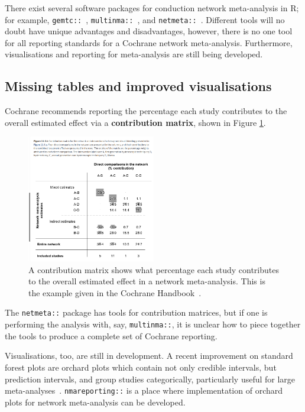\documentclass[12pt]{article}\usepackage[]{graphicx}\usepackage[]{color}
\newcommand{\package}[1]{\texttt{{#1::}}}
\begin{document}
There exist several software packages for conduction network meta-analysis in R; for example, \package{gemtc}~\cite{valkenhoef_gemtc_2020}, \package{multinma}~\cite{phillippo_multinma_2020}, and \package{netmeta}~\cite{rucker_netmeta_2021}. Different tools will no doubt have unique advantages and disadvantages, however, there is no one tool for all reporting standards for a Cochrane network meta-analysis. Furthermore, visualisations and reporting for meta-analysis are still being developed.

\subsection{Missing tables and improved visualisations}


Cochrane recommends reporting the percentage each study contributes to the overall estimated effect via a \textbf{contribution matrix}, shown in Figure \ref{fig:cmatrix}.

\begin{figure}
\centering
\includegraphics[width=0.5\textwidth]{contribution-matrix}
\caption{A contribution matrix shows what percentage each study contributes to the overall estimated effect in a network meta-analysis. This is the example given in the Cochrane Handbook~\cite{higgins2019cochrane}.}
\label{fig:cmatrix}
\end{figure}

The \package{netmeta} package has tools for contribution matrices, but if one is performing the analysis with, say, \package{multinma}, it is unclear how to piece together the tools to produce a complete set of Cochrane reporting.

Visualisations, too, are still in development. A recent improvement on standard forest plots are orchard plots which contain not only credible intervals, but prediction intervals, and group studies categorically, particularly useful for large meta-analyses~\cite{nakagawa_orchard_2021}. \package{nmareporting} is a place where implementation of orchard plots for network meta-analysis can be developed.
\end{document}
